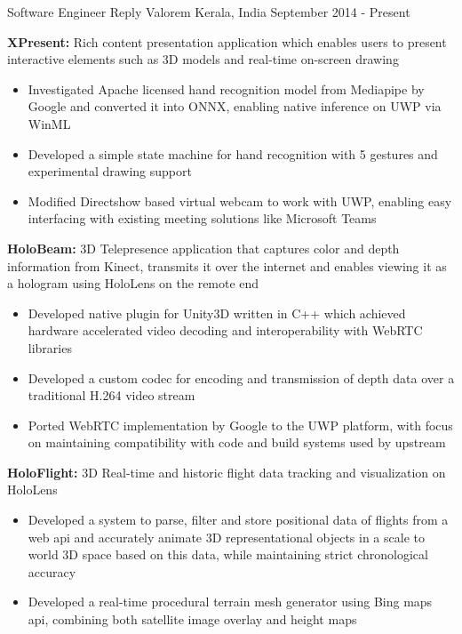 \documentclass[11pt, a4paper]{awesome-cv}
\begin{document}
\begin{cventries}
	\cventry
	{Software Engineer} %
	{Reply Valorem} %
	{Kerala, India} %
	{September 2014 - Present} %
	{
		\begin{cvitems} %
			\item \textbf{XPresent:} Rich content presentation application which enables users to present interactive elements such as 3D models and real-time on-screen drawing
				\begin{itemize} 
					\item Investigated Apache licensed hand recognition model from Mediapipe by Google and converted it into ONNX, enabling native inference on UWP via WinML
					\item Developed a simple state machine for hand recognition with 5 gestures and experimental drawing support
					\item Modified Directshow based virtual webcam to work with UWP, enabling easy interfacing with existing meeting solutions like Microsoft Teams
				\end{itemize}
			\item \textbf{HoloBeam:} 3D Telepresence application that captures color and depth information from Kinect, transmits it over the internet and enables viewing it as a hologram using HoloLens on the remote end
				\begin{itemize} 
					\item Developed native plugin for Unity3D written in C++ which achieved hardware accelerated video decoding and interoperability with WebRTC libraries
					\item Developed a custom codec for encoding and transmission of depth data over a traditional H.264 video stream
					\item Ported WebRTC implementation by Google to the UWP platform, with focus on maintaining compatibility with code and build systems used by upstream
				\end{itemize}
			\item \textbf{HoloFlight:} 3D Real-time and historic flight data tracking and visualization on HoloLens
				\begin{itemize}
					\item Developed a system to parse, filter and store positional data of flights from a web api and accurately animate 3D representational objects in a scale to world 3D space based on this data, while maintaining strict chronological accuracy
					\item Developed a real-time procedural terrain mesh generator using Bing maps api, combining both satellite image overlay and height maps

\end{itemize}
\end{cvitems}}
\end{cventries}
\end{document}
